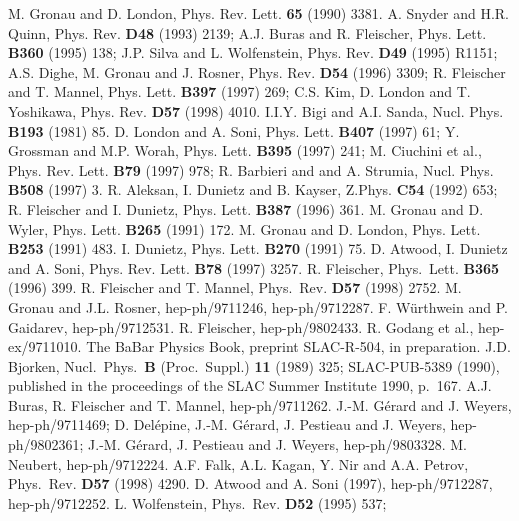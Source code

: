 \begin{thebibliography}{999}
{ M. Gronau and D. London,} { Phys. Rev. Lett.}
 {\bf 65} (1990) 3381.
A. Snyder and H.R. Quinn, { Phys. Rev.} {\bf D48} (1993) 2139;
{ A.J. Buras and R. Fleischer,}
{ Phys. Lett.} {\bf B360} (1995) 138;
J.P. Silva and L. Wolfenstein, 
{ Phys. Rev.} {\bf D49} (1995) R1151; 
{ A.S. Dighe, M. Gronau and J. Rosner}, 
{ Phys. Rev.} {\bf D54} (1996) 3309; 
R. Fleischer and T. Mannel, 
{ Phys. Lett.} {\bf B397} (1997) 269;
C.S. Kim, D. London and T. Yoshikawa, 
{ Phys. Rev.} {\bf D57} (1998) 4010. 
{ I.I.Y. Bigi and A.I. Sanda,}
{ Nucl. Phys.} {\bf B193} (1981) 85.
D. London and A. Soni, { Phys. Lett.} {\bf B407} (1997) 61;
Y. Grossman and M.P. Worah, { Phys. Lett.} {\bf B395} (1997) 241;
M. Ciuchini et al., { Phys. Rev. Lett.} {\bf B79} (1997) 978;
R. Barbieri and and A. Strumia, { Nucl. Phys.} {\bf B508} (1997) 3.
{ R. Aleksan, I. Dunietz and B. Kayser,}
 { Z.Phys.} {\bf C54} (1992) 653;\\
R. Fleischer and I. Dunietz, { Phys. Lett.} {\bf B387} (1996) 361.
{ M. Gronau and D. Wyler,} { Phys. Lett.} {\bf B265} (1991) 172.
M. Gronau and D. London, { Phys. Lett.} {\bf B253} (1991) 483.
{ I. Dunietz}, { Phys. Lett.} {\bf B270} (1991) 75.
D. Atwood, I. Dunietz and A. Soni, 
{ Phys. Rev. Lett.} {\bf B78} (1997) 3257.
R. Fleischer, { Phys.\ Lett.} {\bf B365} (1996) 399.
R. Fleischer and T. Mannel, {Phys.\ Rev.} {\bf D57}
(1998) 2752.
M. Gronau and J.L. Rosner, hep-ph/9711246, hep-ph/9712287.
F. W{\"u}rthwein and P. Gaidarev, hep-ph/9712531.
R. Fleischer, hep-ph/9802433.
R. Godang  et al., hep-ex/9711010.
The BaBar Physics Book, preprint SLAC-R-504, in preparation.
J.D. Bjorken, { Nucl.\ Phys.}~{\bf B} (Proc.\ Suppl.)
{\bf 11} (1989) 325; SLAC-PUB-5389 (1990), published in the proceedings
of the SLAC Summer Institute 1990, p.\ 167.
A.J. Buras, R. Fleischer and T. Mannel, hep-ph/9711262.
J.-M. G{\'e}rard and J. Weyers, hep-ph/9711469; D. Del{\'e}pine,
J.-M. G{\'e}rard, J. Pestieau and J. Weyers, hep-ph/9802361;
J.-M. G{\'e}rard, J. Pestieau and J. Weyers, hep-ph/9803328.
M. Neubert, hep-ph/9712224.
A.F. Falk, A.L. Kagan, Y. Nir and A.A. Petrov, 
{Phys.\ Rev.} {\bf D57} (1998) 4290.
D. Atwood and A. Soni (1997), hep-ph/9712287, hep-ph/9712252.
L. Wolfenstein, {Phys.\ Rev.} {\bf D52} (1995) 537; 

\end{thebibliography}
